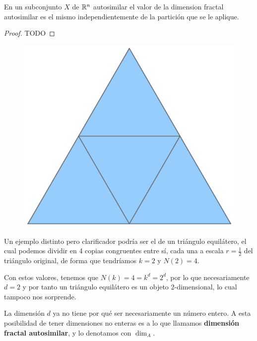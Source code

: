 \begin{proposicion}
En un subconjunto $X$ de $\mathbb{R}^n$ autosimilar el valor de la dimension fractal autosimilar es el mismo independientemente de la partición que se le aplique.
\end{proposicion}
\begin{proof}
TODO
\end{proof}

\begin{figure}
\includegraphics[scale=0.14, trim={0cm 0.35cm 0cm 0.5cm}, clip]{./img/triangulo-dividido.png}
\end{figure}

Un ejemplo distinto pero clarificador podría ser el de un triángulo equilátero, el cual podemos dividir en 4 copias congruentes entre sí, cada una a escala $r=\frac 1 2$ del triángulo original, de forma que tendríamos $k=2$ y $N(2)=4$. 

Con estos valores, tenemos que $N(k)=4=k^d=2^d$, por lo que necesariamente $d=2$ y por tanto un triángulo equilátero es un objeto 2-dimensional, lo cual tampoco nos sorprende.

\begin{observacion}
La dimensión $d$ ya no tiene por qué ser necesariamente un número entero. A esta posibilidad de tener dimensiones no enteras es a lo que llamamos \textbf{dimensión fractal autosimilar}, y lo denotamos con $\dim_A$.
\end{observacion}


